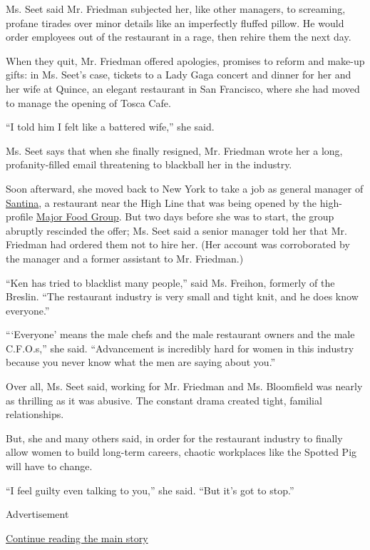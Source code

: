 Ms. Seet said Mr. Friedman subjected her, like other managers, to
screaming, profane tirades over minor details like an imperfectly
fluffed pillow. He would order employees out of the restaurant in a
rage, then rehire them the next day.

When they quit, Mr. Friedman offered apologies, promises to reform and
make-up gifts: in Ms. Seet's case, tickets to a Lady Gaga concert and
dinner for her and her wife at Quince, an elegant restaurant in San
Francisco, where she had moved to manage the opening of Tosca Cafe.

``I told him I felt like a battered wife,'' she said.

Ms. Seet says that when she finally resigned, Mr. Friedman wrote her a
long, profanity-filled email threatening to blackball her in the
industry.

Soon afterward, she moved back to New York to take a job as general
manager of
\href{https://www.nytimes3xbfgragh.onion/2015/04/22/dining/restaurant-review-santina-in-the-meatpacking-district.html}{Santina},
a restaurant near the High Line that was being opened by the
high-profile \href{https://www.majorfood.com/}{Major Food Group}. But
two days before she was to start, the group abruptly rescinded the
offer; Ms. Seet said a senior manager told her that Mr. Friedman had
ordered them not to hire her. (Her account was corroborated by the
manager and a former assistant to Mr. Friedman.)

``Ken has tried to blacklist many people,'' said Ms. Freihon, formerly
of the Breslin. ``The restaurant industry is very small and tight knit,
and he does know everyone.''

```Everyone' means the male chefs and the male restaurant owners and the
male C.F.O.s,'' she said. ``Advancement is incredibly hard for women in
this industry because you never know what the men are saying about
you.''

Over all, Ms. Seet said, working for Mr. Friedman and Ms. Bloomfield was
nearly as thrilling as it was abusive. The constant drama created tight,
familial relationships.

But, she and many others said, in order for the restaurant industry to
finally allow women to build long-term careers, chaotic workplaces like
the Spotted Pig will have to change.

``I feel guilty even talking to you,'' she said. ``But it's got to
stop.''

Advertisement

\protect\hyperlink{after-bottom}{Continue reading the main story}

